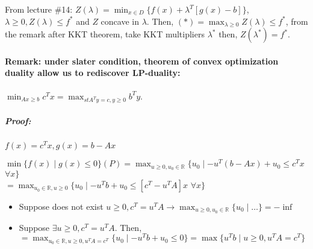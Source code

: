 \documentclass[main]{subfiles}
\begin{document}
From lecture \#14: $Z(\lambda) = \min_{x \in D} \{f(x) + \lambda^{T}[g(x) -b] \}$, $\lambda \geq 0, Z(\lambda) \leq f^{*}$ and $Z$ concave in $\lambda$.
Then, $(*) = \max_{\lambda \geq 0} Z(\lambda) \leq f^{*}$, from the remark after KKT theorem, take KKT multipliers $\lambda^{*}$ then, $Z(\lambda^{*}) = f^{*}$.

\paragraph{Remark: under slater condition, theorem of convex optimization duality allow us to rediscover LP-duality:}
$\displaystyle \min_{Ax \geq b} c^{T}x = \max_{st A^{T}y = c, y \geq 0} b^{T}y$.

\subparagraph{Proof:}
$f(x) = c^{T}x, g(x) = b - Ax$

$\displaystyle \min \{f(x) \mid g(x) \leq 0 \} (P) = \max_{u \geq 0, u_{0} \in \mathbb{R}} \{ u_{0} \mid -u^{T}(b-Ax) + u_{0} \leq c^{T}x$ $ \forall x \}$ \\
$ = \displaystyle \max_{u_{0} \in \mathbb{R}, u \geq 0} \{ u_{0} \mid -u^{T}b + u_{0} \leq [c^{T} - u^{T}A]x$ $\forall x \}$

\begin{itemize}
\item Suppose does not exist $u \geq 0, c^{T} = u^{T}A \rightarrow \max_{u \geq 0, u_{0} \in \mathbb{R}} \{ u_{0} \mid \dots \} = - \inf$
\item Suppose $\exists u \geq 0, c^{T} = u^{T}A$. Then, $ = \displaystyle \max_{u_{0} \in \mathbb{R}, u \geq 0, u^{T}A = c^{T}} \{u_{0} \mid -u^{T}b + u_{0} \leq 0 \} = \max \{ u^{T}b \mid u \geq 0, u^{T}A = c^{T} \}$
\end{itemize}
\end{document}
